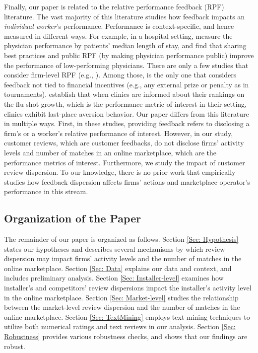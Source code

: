 \documentclass[msom,blindrev]{informs3}
\begin{document}
	
	
	
	Finally, our paper is related to the relative performance feedback (RPF) literature. The vast majority of this literature studies how feedback impacts an \emph{individual worker}'s performance. Performance is context-specific, and hence measured in different ways. For example, in a hospital setting, \cite{song2017closing} measure the physician performance by patients' median length of stay, and find that sharing best practices and public RPF (by making physician performance public) improve the performance of low-performing physicians. There are only a few studies that consider firm-level RPF (e.g., \cite{josse2013}). Among those, \cite{staats} is the only one that considers feedback not tied to financial incentives (e.g., any external prize or penalty as in tournaments). \cite{staats} establish that when clinics are informed about their rankings on the flu shot growth, which is the performance metric of interest in their setting, clinics exhibit last-place aversion behavior. Our paper differs from this literature in multiple ways. First, in these studies, providing feedback refers to disclosing a firm's or a worker's relative performance of interest. However, in our study, customer reviews, which are customer feedbacks, do not disclose  firms' activity levels and number of matches in an online marketplace, which are the performance metrics of interest. Furthermore, we study the impact of customer review dispersion. To our knowledge, there is no prior work that empirically studies how feedback dispersion affects firms' actions and marketplace operator's performance in this stream.
	
\subsection{Organization of the Paper}
	
	The remainder of our paper is organized as follows. Section \ref{Sec: Hypothesis} states our hypotheses and describes several mechanisms by which review dispersion may impact firms' activity levels and the number of matches in the online marketplace. Section \ref{Sec: Data} explains our data and context, and includes preliminary analysis. Section \ref{Sec: Installer-level} examines how installer's and competitors' review dispersions impact the installer's activity level in the online marketplace. Section \ref{Sec: Market-level} studies the relationship between the market-level review dispersion and the number of matches in the online marketplace. Section \ref{Sec: TextMining} employs text-mining techniques to utilize both numerical ratings and text reviews in our analysis. Section \ref{Sec: Robustness}  provides various robustness checks, and shows that our findings are robust.
	
\end{document}
